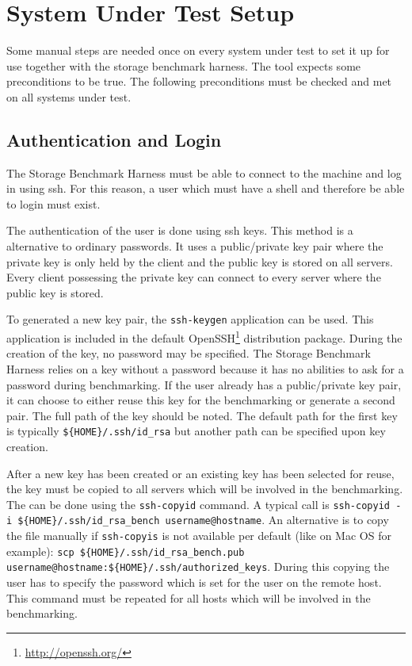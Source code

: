 \chapter{System Under Test Setup}
\label{sec:Setup}
Some manual steps are needed once on every system under test to set it up for
use together with the storage benchmark harness. The tool expects some
preconditions to be true. The following preconditions must be checked and met on
all systems under test.

\section{Authentication and Login}
\label{sec:usage_ssh_key}
The Storage Benchmark Harness must be able to connect to the machine and log in
using ssh. For this reason, a user which must have a shell and therefore be able
to login must exist. 

The authentication of the user is done using ssh keys. This method is a
alternative to ordinary passwords. It uses a public/private key pair where the
private key is only held by the client and the public key is stored on all
servers. Every client possessing the private key can connect to every server
where the public key is stored.

To generated a new key pair, the \texttt{ssh-keygen} application can be used.
This application is included in the default
OpenSSH\footnote{\url{http://openssh.org/}} distribution package. During the
creation of the key, no password may be specified. The Storage Benchmark Harness
relies on a key without a password because it has no abilities to ask for a
password during benchmarking.
If the user already has a public/private key pair, it can choose to either reuse this key
for the benchmarking or generate a second pair. The full path of the key should
be noted. The default path for the first key is typically
\texttt{\$\{HOME\}/.ssh/id\_rsa} but another path can be specified upon key
creation.

After a new key has been created or an existing key has been selected for reuse,
the key must be copied to all servers which will be involved in the
benchmarking. The can be done using the \texttt{ssh-copyid} command. A typical
call is \texttt{ssh-copyid -i \$\{HOME\}/.ssh/id\_rsa\_bench username@hostname}. 
An alternative is to copy the file manually if \texttt{ssh-copyis} is not available 
per default (like on Mac OS for example): 
\texttt{scp \$\{HOME\}/.ssh/id\_rsa\_bench.pub username@hostname:\$\{HOME\}/.ssh/authorized\_keys}.
During this copying the user has to specify the password which is set for the
user on the remote host. This command must be repeated for all hosts which will
be involved in the benchmarking.

